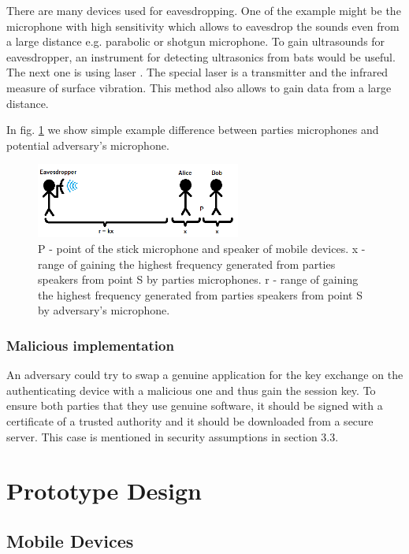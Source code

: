 \documentclass[11pt,titlepage]{article}
\theoremstyle{plain}
\begin{document}
There are many devices used for eavesdropping. One of the example might be the microphone with high sensitivity which allows to eavesdrop the sounds even from a large distance e.g. parabolic or shotgun  microphone. To gain ultrasounds for eavesdropper, an instrument for detecting ultrasonics from bats would be useful. The next one is using laser \cite{laser_mic}. The special laser is a transmitter and the infrared measure of surface vibration. This method also allows to gain data from a large distance. 

\vspace{5mm}

In fig. \ref{fig:F30} we show simple example difference between parties microphones and potential adversary's microphone.

\begin{figure}[H]
	\centering
	\includegraphics[width=0.6\textwidth]{img/adversary}
	\caption{P - point of the stick microphone and speaker of mobile devices. x - range of gaining the highest frequency generated from parties speakers from point S by parties microphones. r - range of gaining the highest frequency generated from parties speakers from point S by adversary's microphone.}
	\label{fig:F30}
\end{figure}

\subsubsection{Malicious implementation}
An adversary could try to swap a genuine application for the key exchange on the authenticating device with a malicious one and thus gain the session key. To ensure both parties that they use genuine software, it should be signed with a certificate of a trusted authority and it should be downloaded from a secure server. This case is mentioned in security assumptions in section 3.3.



\section{Prototype Design}
\subsection{Mobile Devices}
\end{document}
